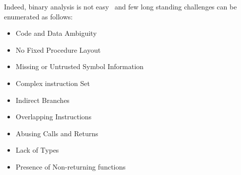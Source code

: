 Indeed, binary analysis is not easy~\cite{Meng:2016} and few long standing
challenges can be enumerated as follows:
\begin{itemize}
    \item Code and Data Ambiguity
    \item No Fixed Procedure Layout
    \item Missing or Untrusted Symbol Information
    \item Complex instruction Set
    \item Indirect Branches
    \item Overlapping Instructions
    \item Abusing Calls and Returns
    \item Lack of Types
    \item Presence of Non-returning functions
\end{itemize}   
